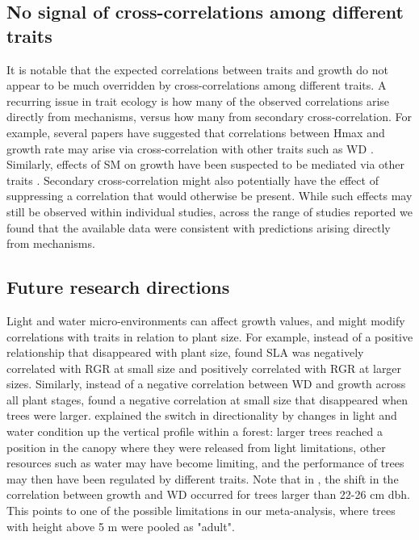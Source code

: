 \documentclass[a4paper]{article}\usepackage[]{graphicx}\usepackage[]{color}
\begin{document}
\subsection*{No signal of cross-correlations among different traits}

It is notable that the expected correlations between traits and growth do not appear to be much overridden by cross-correlations among different traits. A recurring issue in trait ecology is how many of the observed correlations arise directly from mechanisms, versus how many from secondary cross-correlation. For example, several papers have suggested that correlations between Hmax and growth rate may arise via cross-correlation with other traits such as WD \citep{Thomas:1996do, Poorter:2006vb, Wright:2010tp}. Similarly, effects of SM on growth have been suspected to be mediated via other traits \citep{Shipley:1990js,Westoby:2002ft,Poorter:2006vb}. Secondary cross-correlation might also potentially have the effect of suppressing a correlation that would otherwise be present. While such effects may still be observed within individual studies, across the range of studies reported we found that the available data were consistent with predictions arising directly from mechanisms. 

\subsection*{Future research directions}

Light and water micro-environments can affect growth values, and might modify correlations with traits in relation to plant size. For example, instead of a positive relationship that disappeared with plant size, \citet{Iida:2014ep} found SLA was negatively correlated with RGR at small size and positively correlated with RGR at larger sizes. Similarly, instead of a negative correlation between WD and growth across all plant stages, \citep{Iida:2014ep,Iida:2014hq} found a negative correlation at small size that disappeared when trees were larger. \citet{Iida:2014hq} explained the switch in directionality by changes in light and water condition up the vertical profile within a forest: larger trees reached a position in the canopy where they were released from light limitations, other resources such as water may have become limiting, and the performance of trees may then have been regulated by different traits. Note that in \citet{Iida:2014hq}, the shift in the correlation between growth and WD occurred for trees larger than 22-26 cm dbh. This points to one of the possible limitations in our meta-analysis, where trees with height above 5 m were pooled as "adult". 
\end{document}
